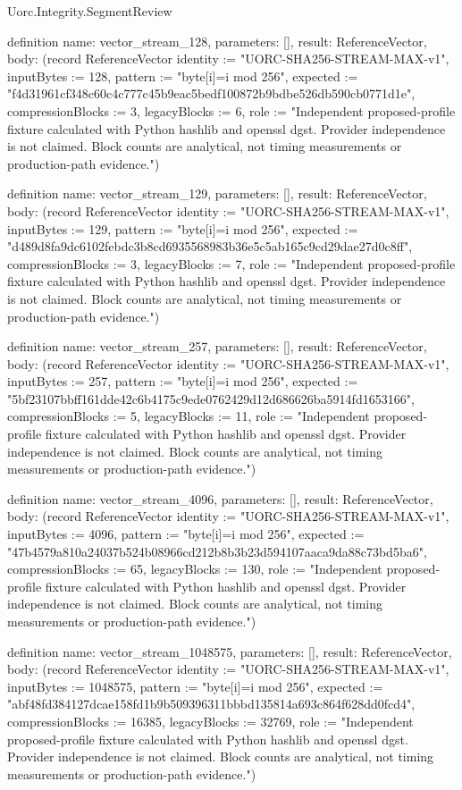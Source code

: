 \begin{lexlean}{Uorc.Integrity.SegmentReview}
\begin{semanticmodule}
definition{
  name: vector_stream_128,
  parameters: [],
  result: ReferenceVector,
  body: (record ReferenceVector {identity := "UORC-SHA256-STREAM-MAX-v1", inputBytes := 128, pattern := "byte[i]=i mod 256", expected := "f4d31961cf348c60c4c777c45b9eac5bedf100872b9bdbe526db590cb0771d1e", compressionBlocks := 3, legacyBlocks := 6, role := "Independent proposed-profile fixture calculated with Python hashlib and openssl dgst. Provider independence is not claimed. Block counts are analytical, not timing measurements or production-path evidence."})
}

definition{
  name: vector_stream_129,
  parameters: [],
  result: ReferenceVector,
  body: (record ReferenceVector {identity := "UORC-SHA256-STREAM-MAX-v1", inputBytes := 129, pattern := "byte[i]=i mod 256", expected := "d489d8fa9dc6102febdc3b8cd6935568983b36e5c5ab165c9cd29dae27d0c8ff", compressionBlocks := 3, legacyBlocks := 7, role := "Independent proposed-profile fixture calculated with Python hashlib and openssl dgst. Provider independence is not claimed. Block counts are analytical, not timing measurements or production-path evidence."})
}

definition{
  name: vector_stream_257,
  parameters: [],
  result: ReferenceVector,
  body: (record ReferenceVector {identity := "UORC-SHA256-STREAM-MAX-v1", inputBytes := 257, pattern := "byte[i]=i mod 256", expected := "5bf23107bbff161dde42c6b4175c9ede0762429d12d686626ba5914fd1653166", compressionBlocks := 5, legacyBlocks := 11, role := "Independent proposed-profile fixture calculated with Python hashlib and openssl dgst. Provider independence is not claimed. Block counts are analytical, not timing measurements or production-path evidence."})
}

definition{
  name: vector_stream_4096,
  parameters: [],
  result: ReferenceVector,
  body: (record ReferenceVector {identity := "UORC-SHA256-STREAM-MAX-v1", inputBytes := 4096, pattern := "byte[i]=i mod 256", expected := "47b4579a810a24037b524b08966cd212b8b3b23d594107aaca9da88c73bd5ba6", compressionBlocks := 65, legacyBlocks := 130, role := "Independent proposed-profile fixture calculated with Python hashlib and openssl dgst. Provider independence is not claimed. Block counts are analytical, not timing measurements or production-path evidence."})
}

definition{
  name: vector_stream_1048575,
  parameters: [],
  result: ReferenceVector,
  body: (record ReferenceVector {identity := "UORC-SHA256-STREAM-MAX-v1", inputBytes := 1048575, pattern := "byte[i]=i mod 256", expected := "abf48fd384127dcae158fd1b9b509396311bbbd135814a693c864f628dd0fcd4", compressionBlocks := 16385, legacyBlocks := 32769, role := "Independent proposed-profile fixture calculated with Python hashlib and openssl dgst. Provider independence is not claimed. Block counts are analytical, not timing measurements or production-path evidence."})
}


\end{semanticmodule}
\end{lexlean}
